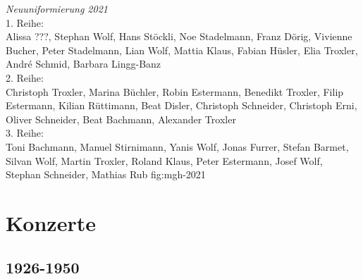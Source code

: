 \documentclass[]{book}
\begin{document}
{\emph{Neuuniformierung 2021}\\
    1. Reihe:\\
    Alissa ???, Stephan Wolf, Hans Stöckli, Noe Stadelmann, Franz Dörig,
    Vivienne Bucher, Peter Stadelmann, Lian Wolf, Mattia Klaus, Fabian Hüsler,
    Elia Troxler, André Schmid, Barbara Lingg-Banz\\
    2. Reihe:\\
    Christoph Troxler, Marina Büchler, Robin Estermann, Benedikt Troxler, Filip
    Estermann, Kilian Rüttimann, Beat Disler, Christoph Schneider, Christoph
    Erni, Oliver Schneider, Beat Bachmann, Alexander Troxler\\
    3. Reihe:\\
    Toni Bachmann, Manuel Stirnimann, Yanis Wolf, Jonas Furrer, Stefan Barmet,
    Silvan Wolf, Martin Troxler, Roland Klaus, Peter Estermann, Josef Wolf, Stephan
    Schneider, Mathias Rub
} {fig:mgh-2021}


\part{Konzerte}
\chapter{1926-1950}
\end{document}
